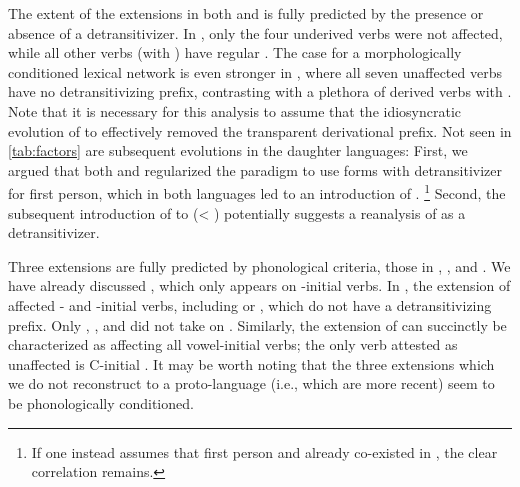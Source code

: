 

The extent of the extensions in both \PWai and \PPek is fully predicted by the presence or absence of a detransitivizer.
In \PWai, only the four underived  verbs were not affected, while all other  verbs (with \detrz) have regular .
The case for a morphologically conditioned lexical network is even stronger in \PPek, where all seven unaffected verbs have no detransitivizing prefix, contrasting with a plethora of derived  verbs with .
Note that it is necessary for this analysis to assume that the idiosyncratic evolution of   to  effectively removed the transparent derivational prefix.
Not seen in \cref{tab:factors} are subsequent evolutions in the daughter languages:
First, we argued that both \ikpeng and \bakairi regularized the paradigm to use forms with detransitivizer for first person, which in both languages led to an introduction of .%
\footnote{If one instead assumes that first person  and  already co-existed in \PPek, the clear correlation remains.}
Second, the subsequent introduction of  to \ikpeng {}  (< ) potentially suggests a reanalysis of  as a detransitivizer.

Three extensions are fully predicted by phonological criteria, those in \akuriyo, \carijo, and \yukpa.
We have already discussed \akuriyo {} , which only appears on -initial verbs.
In \carijo, the extension of  affected - and -initial verbs, including   or  , which do not have a detransitivizing prefix.
Only  ,  , and   did not take on .
Similarly, the extension of \yukpa {} can succinctly be characterized as affecting all vowel-initial verbs; the only verb attested as unaffected is C-initial  .
It may be worth noting that the three extensions which we do not reconstruct to a proto-language (i.e., which are more recent) seem to be phonologically conditioned.

